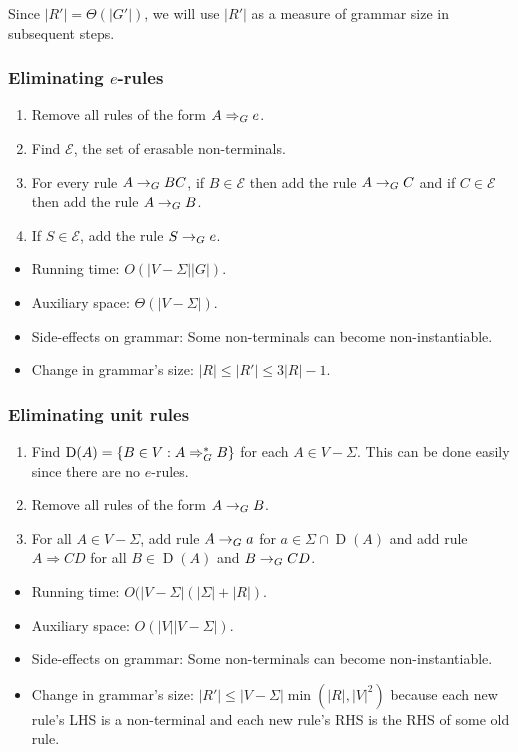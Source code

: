 Since $|R'| = \Theta(|G'|)$, we will use $|R'|$ as a measure of grammar size in subsequent steps.

\subsubsection[Eliminating e-rules]{Eliminating $e$-rules}

\begin{enumerate}
\item Remove all rules of the form $A \Rightarrow_{G} e$.
\item Find $\mathcal{E}$, the set of erasable non-terminals.
\item For every rule $A \rightarrow_{G} BC$,
    if $B \in \mathcal{E}$ then add the rule $A \rightarrow_{G} C$
    and if $C \in \mathcal{E}$ then add the rule $A \rightarrow_{G} B$.
\item If $S \in \mathcal{E}$, add the rule $S \rightarrow_{G} e$.
\end{enumerate}

\begin{itemize}
\item Running time: $O(|V-\Sigma||G|)$.
\item Auxiliary space: $\Theta(|V-\Sigma|)$.
\item Side-effects on grammar: Some non-terminals can become non-instantiable.
\item Change in grammar's size: $|R| \le |R'| \le 3|R|-1$.
\end{itemize}

\subsubsection{Eliminating unit rules}

\begin{enumerate}
\item Find $\operatorname{D}(A) = \{B \in V: A \Rightarrow_{G}^* B\}$ for each $A \in V-\Sigma$.
    This can be done easily since there are no $e$-rules.
\item Remove all rules of the form $A \rightarrow_{G} B$.
\item For all $A \in V - \Sigma$, add rule $A \rightarrow_{G} a$ for $a \in \Sigma \cap \operatorname{D}(A)$
    and add rule $A \Rightarrow CD$ for all $B \in \operatorname{D}(A)$ and $B \rightarrow_{G} CD$.
\end{enumerate}

\begin{itemize}
\item Running time: $O(|V-\Sigma|(|\Sigma| + |R|)$.
\item Auxiliary space: $O(|V||V-\Sigma|)$.
\item Side-effects on grammar: Some non-terminals can become non-instantiable.
\item Change in grammar's size: $|R'| \le |V-\Sigma|\min(|R|, |V|^2)$
    because each new rule's LHS is a non-terminal and each new rule's RHS is the RHS of some old rule.
\end{itemize}

